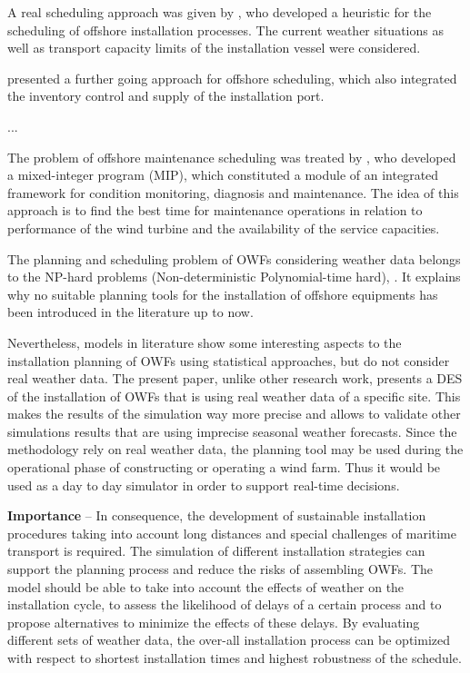 A real scheduling approach was given by \cite{Scholz2010}, who developed a heuristic for the scheduling of offshore installation processes. The current weather situations as well as transport capacity limits of the installation vessel were considered.



\cite{ISOPE2012} presented a further going approach for offshore scheduling, which also integrated the inventory control and supply of the installation port.




\cite{Hofmann2014} ...



The problem of offshore maintenance scheduling was treated by \cite{Kovacs2011497}, who developed a mixed-integer program (MIP), which constituted a module of an integrated framework for condition monitoring, diagnosis and maintenance. The idea of this approach is to find the best time for maintenance operations in relation to performance of the wind turbine and the availability of the service capacities.

The planning and scheduling problem of OWFs considering weather data belongs to the NP-hard problems (Non-deterministic Polynomial-time hard), \cite{leeuwen1990}. It explains why no suitable planning tools for the installation of offshore equipments has been introduced in the literature up to now. 

Nevertheless, models in literature show some interesting aspects to the installation planning of OWFs using statistical approaches, but do not consider real weather data. The present paper, unlike other research work, presents a DES of the installation of OWFs that is using real weather data of a specific site. This makes the results of the simulation way more precise and allows to validate other simulations results that are using imprecise seasonal weather forecasts. Since the methodology rely on real weather data, the planning tool may be used during the operational phase of constructing or operating a wind farm. Thus it would be used as a day to day simulator in order to support real-time decisions.

\textbf{Importance} --
In consequence, the development of sustainable installation procedures taking into account long distances and special challenges of maritime transport is required. The simulation of different installation strategies can support the planning process and reduce the risks of assembling OWFs. The model should be able to take into account the effects of weather on the installation cycle, to assess the likelihood of delays of a certain process and to propose alternatives to minimize the effects of these delays. By evaluating different sets of weather data, the over-all installation process can be optimized with respect to shortest installation times and highest robustness of the schedule.

